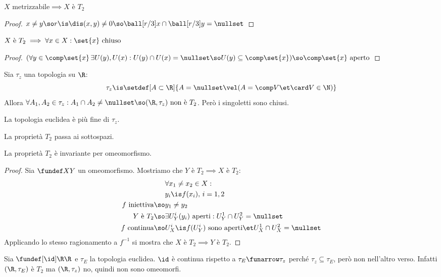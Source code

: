 \begin{prop}
$X\text{ metrizzabile}\implies X\text{ è }T_2$
\end{prop}
\begin{proof}
$x\neq y\so r\is\dis(x,y)\neq 0\so\ball[r/3]x\cap\ball[r/3]y=\nullset$
\end{proof}

\begin{prop}
$X\text{ è }T_2\implies\forall x\in X:\set{x}\text{ chiuso}$
\end{prop}
\begin{proof}
$(\forall y\in\comp\set{x}\,\exists U(y),U(x):U(y)\cap U(x)=\nullset\so U(y)\subseteq\comp\set{x})\so\comp\set{x}\text{ aperto}$
\end{proof}

\begin{es}
Sia $\tau_z$ una topologia su $\R$:
\[\tau_z\is\setdef[A\subset\R]{A=\nullset\vel(A=\comp V\et\card V\in\N)}\]
Allora $\forall A_1,A_2\in\tau_z:A_1\cap A_2\neq\nullset\so(\R,\tau_z)\text{ non è }T_2$. Però i singoletti sono chiusi.
\end{es}

\begin{oss}
La topologia euclidea è più fine di $\tau_z$.
\end{oss}

\begin{prop}
La proprietà $T_2$ passa ai sottospazi.
\end{prop}

\begin{prop}
La proprietà $T_2$ è invariante per omeomorfismo.
\end{prop}
\begin{proof}
Sia $\fundef XY$ un omeomorfismo. Mostriamo che $Y\text{ è }T_2\implies X\text{ è }T_2$:
\begin{align*}
&\forall x_1\neq x_2\in X:\\
&y_i\is f(x_i),\,i=1,2\\
f\text{ iniettiva}\so&y_1\neq y_2\\
Y\text{ è }T_2\so&\exists U_Y^i(y_i)\text{ aperti}:U_Y^1\cap U_Y^2=\nullset\\
f\text{ continua}\so&U_X^i\is f(U_Y^i)\text{ sono aperti}\et U_X^1\cap U_X^2=\nullset
\end{align*}
Applicando lo stesso ragionamento a $f^{-1}$ si mostra che $X\text{ è }T_2\implies Y\text{ è }T_2$.
\end{proof}

\begin{es}
Sia $\fundef[\id]\R\R$ e $\tau_E$ la topologia euclidea. $\id$ è continua rispetto a $\tau_E\funarrow\tau_z$ perché $\tau_z\subseteq\tau_E$, però non nell'altro verso. Infatti $(\R,\tau_E)$ è $T_2$ ma $(\R,\tau_z)$ no, quindi non sono omeomorfi.
\end{es}

